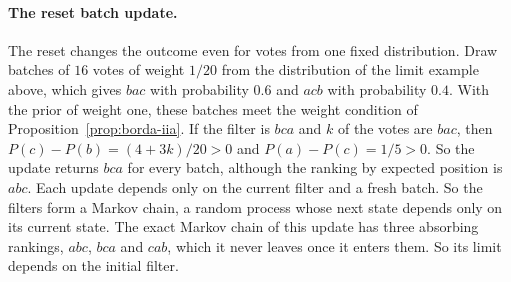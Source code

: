 \paragraph{The reset batch update.} The reset changes the outcome even for votes from one fixed distribution. Draw batches of $16$ votes of weight $1/20$ from the distribution of the limit example above, which gives $bac$ with probability $0.6$ and $acb$ with probability $0.4$. With the prior of weight one, these batches meet the weight condition of Proposition~\ref{prop:borda-iia}. If the filter is $bca$ and $k$ of the votes are $bac$, then $P(c)-P(b)=(4+3k)/20>0$ and $P(a)-P(c)=1/5>0$. So the update returns $bca$ for every batch, although the ranking by expected position is $abc$. Each update depends only on the current filter and a fresh batch. So the filters form a Markov chain, a random process whose next state depends only on its current state. The exact Markov chain of this update has three absorbing rankings, $abc$, $bca$ and $cab$, which it never leaves once it enters them. So its limit depends on the initial filter.
